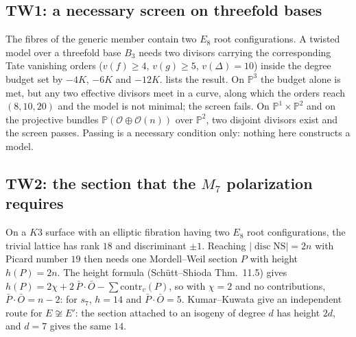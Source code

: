 \documentclass[11pt,a4paper]{article}
\theoremstyle{remark}
\begin{document}
\begin{table}[h]
\centering

\caption{The two degrees that the earlier plan had merged, from the $s_7$ operator's exponents.}\label{tab:tw0}
\end{table}

\subsection{TW1: a necessary screen on threefold bases}

The fibres of the generic member contain two $E_8$ root configurations. A twisted model over a threefold base
$B_3$ needs two divisors carrying the corresponding Tate vanishing orders ($v(f)\ge4$, $v(g)\ge5$,
$v(\Delta)=10$) inside the degree budget set by $-4K$, $-6K$ and $-12K$.  lists the result.
On $\mathbb{P}^3$ the budget alone is met, but any two effective divisors meet in a curve, along which the
orders reach $(8,10,20)$ and the model is not minimal; the screen fails. On $\mathbb{P}^1\times\mathbb{P}^2$
and on the projective bundles $\mathbb{P}(\mathcal{O}\oplus\mathcal{O}(n))$ over $\mathbb{P}^2$, two disjoint
divisors exist and the screen passes. Passing is a necessary condition only: nothing here constructs a model.

\begin{table}[h]
\centering

\caption{Two-divisor degree screen. The certificates were written on 2026-07-29 and their status string
still reads ``DRAFT''; the screen was made live by ruling D20$'$ on 2026-10-07 (\cref{sec:corrections}).}\label{tab:tw1}
\end{table}

\subsection{TW2: the section that the $M_7$ polarization requires}

On a $K3$ surface with an elliptic fibration having two $E_8$ root configurations, the trivial lattice has
rank $18$ and discriminant $\pm1$. Reaching $|\operatorname{disc}\mathrm{NS}|=2n$ with Picard number $19$
then needs one Mordell--Weil section $P$ with height $h(P)=2n$. The height formula (Sch\"utt--Shioda
Thm.~11.5) gives $h(P)=2\chi+2\,\bar P\cdot\bar O-\sum\mathrm{contr}_v(P)$, so with $\chi=2$ and no
contributions, $\bar P\cdot\bar O=n-2$: for $s_7$, $h=14$ and $\bar P\cdot\bar O=5$. Kumar--Kuwata give an
independent route for $E\not\cong E'$: the section attached to an isogeny of degree $d$ has height $2d$,
and $d=7$ gives the same $14$.
\end{document}
